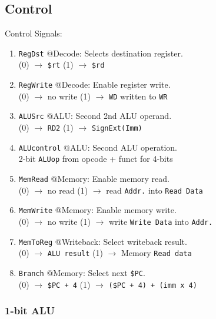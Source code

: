 \documentclass[12pt, a4paper]{article}
\begin{document}
\begin{multicols*}{3}
\colbreak
\subsection{Control}
Control Signals:
\begin{enumerate}[\roman*.]
  \item \lstinline|RegDst| @Decode: Selects destination register.\\
    (0) $\rightarrow$ \lstinline|$rt|
    (1) $\rightarrow$ \lstinline|$rd|
  \item \lstinline|RegWrite| @Decode: Enable register write.\\
    (0) $\rightarrow$ no write
    (1) $\rightarrow$ \lstinline|WD| written to \lstinline|WR|
  \item \lstinline|ALUSrc| @ALU: Second 2nd ALU operand.\\ 
    (0) $\rightarrow$ \lstinline|RD2|
    (1) $\rightarrow$ \lstinline|SignExt(Imm)|
  \item \lstinline|ALUcontrol| @ALU: Second ALU operation.\\
    2-bit \lstinline|ALUop| from opcode + funct for 4-bits
  \item \lstinline|MemRead| @Memory: Enable memory read.\\
    (0) $\rightarrow$ no read
    (1) $\rightarrow$ read \lstinline|Addr.| into \lstinline|Read Data|
  \item \lstinline|MemWrite| @Memory: Enable memory write.\\
    (0) $\rightarrow$ no write
    (1) $\rightarrow$ write \lstinline|Write Data| into \lstinline|Addr.|
  \item \lstinline|MemToReg| @Writeback: Select writeback result.\\
    (0) $\rightarrow$ \lstinline|ALU result|
    (1) $\rightarrow$ Memory \lstinline|Read data|
  \item \lstinline|Branch| @Memory: Select next \lstinline|$PC|.\\
    (0) $\rightarrow$ \lstinline|$PC + 4|
    (1) $\rightarrow$ \lstinline|($PC + 4) + (imm x 4)|
\end{enumerate}


\subsubsection{1-bit ALU}

\end{multicols*}
\end{document}
